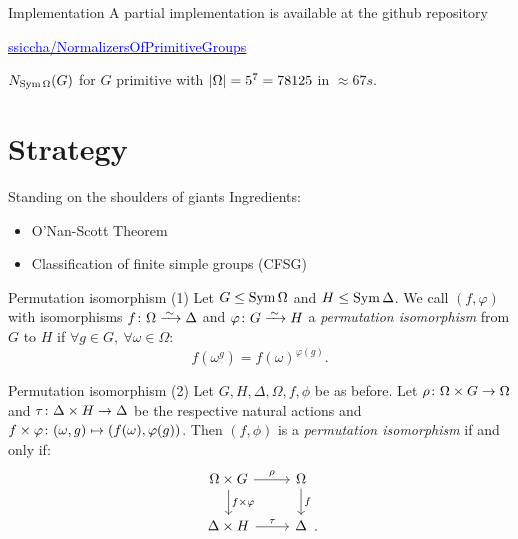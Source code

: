 \documentclass{beamer}
\theoremstyle{plain}
\theoremstyle{definition}
\begin{document}
\begin{frame}{Implementation}
A partial implementation is available at the github repository
\begin{center}
\href{https://github.com/ssiccha/NormalizersOfPrimitiveGroups}
{\textcolor{blue}{ssiccha/NormalizersOfPrimitiveGroups}}
\end{center}
\vspace{1\baselineskip}

$N_{\operatorname{Sym} \Omega}(G)$ for $G$ primitive with $ \left| \Omega \right|  = 5 ^ 7 = 78125$ in
$\approx 67 s$.
\end{frame}


\section{Strategy}
\begin{frame}{Standing on the shoulders of giants}
Ingredients:
\begin{itemize}
\item O'Nan-Scott Theorem
\item Classification of finite simple groups (CFSG)
\end{itemize}
\end{frame}

\begin{frame}{Permutation isomorphism (1)}
Let $G \leq \operatorname{Sym} \Omega$ and $H \leq \operatorname{Sym} \Delta$.
We call $(f, \varphi)$ with
isomorphisms
$f \from \Omega \iso \Delta$
and
$\varphi \from G \iso H$
a \emph{permutation isomorphism}
from $G$ to $H$
if
$\forall g \in G, ~ \forall \omega \in \Omega :$
\[
    f(\omega ^ g) = f(\omega) ^ {\varphi(g)}.
\]
\end{frame}

\begin{frame}{Permutation isomorphism (2)}
Let $G, H, \Delta, \Omega, f, \phi$ be as before.
Let $\rho \colon \Omega \times G \rightarrow \Omega$ and
$\tau \colon \Delta \times H \rightarrow \Delta$ be the respective natural actions
and $f \times \varphi \colon (\omega, g) \mapsto (f(\omega), \varphi(g))$.
\pause
Then $(f, \phi)$ is a \emph{permutation isomorphism}
if and only if:
\vspace{1em}
\[
\begin{tikzcd}[ampersand replacement=\&]
    \Omega \times G
        \ar[r, "\rho"]
        \ar[d, "f \times \varphi"]
    \&
    \Omega
        \ar[d, "f"]
    \\
    \Delta \times H
        \ar[r, "\tau"]
    \&
    \Delta
\end{tikzcd}
\raisebox{-2em}{.}
\]
\end{frame}
\end{document}
